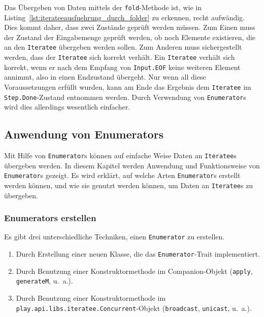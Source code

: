 Das Übergeben von Daten mittels der \lstinline|fold|-Methode ist, wie in Listing~\ref{lst:iterateeausfuehrung_durch_folder} zu erkennen, recht aufwändig.
Dies kommt daher, dass zwei Zustände geprüft werden müssen.
Zum Einen muss der Zustand der Eingabemenge geprüft werden, ob noch Elemente existieren, die an den \lstinline|Iteratee| übergeben werden sollen.
Zum Anderen muss sichergestellt werden, dass der \lstinline|Iteratee| sich korrekt verhält.
Ein \lstinline|Iteratee| verhält sich korrekt, wenn er nach dem Empfang von \lstinline|Input.EOF| keine weiteren Element annimmt, also in einen Endzustand übergeht.
Nur wenn all diese Voraussetzungen erfüllt wurden, kann am Ende das Ergebnis dem \lstinline|Iteratee| im \lstinline|Step.Done|-Zustand entnommen werden.
Durch Verwendung von \lstinline|Enumerator|s wird dies allerdings wesentlich einfacher.



\subsection{Anwendung von Enumerators} %
\label{sub:enumerators}

Mit Hilfe von \lstinline|Enumerator|s können auf einfache Weise Daten an \lstinline|Iteratee|s übergeben werden.
In diesem Kapitel werden Anwendung und Funktionsweise von \lstinline|Enumerator|s gezeigt.
Es wird erklärt, auf welche Arten \lstinline|Enumerator|s erstellt werden können, und wie sie genutzt werden können, um Daten an \lstinline|Iteratee|s zu übergeben.

\subsubsection{Enumerators erstellen} %
\label{ssub:enumerators_erstellen}

Es gibt drei unterschiedliche Techniken, einen \lstinline|Enumerator| zu erstellen.
\begin{enumerate}
  \item Durch Erstellung einer neuen Klasse, die das \lstinline|Enumerator|-Trait implementiert.
  \item Durch Benutzung einer Konstruktormethode im Companion-Objekt (\lstinline|apply|, \lstinline|generateM|, u.~a.).
  \item Durch Benutzung einer Konstruktormethode im \lstinline|play.api.libs.iteratee.Concurrent|-Objekt (\lstinline|broadcast|, \lstinline|unicast|, u.~a.).
\end{enumerate}

